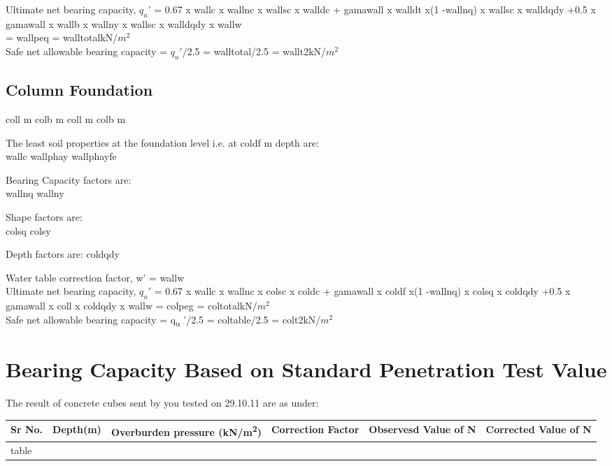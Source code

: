 \documentclass{soil12}
\begin{document}
Ultimate net bearing capacity, $q_u$' = 0.67 x {{wallc}} x {{wallnc}} x {{wallsc}} x {{walldc}} + {{gamawall}} x {{walldt}} x(1 -{{wallnq}}) x {{wallsc}} x {{walldqdy}} +0.5 x {{gamawall}} x {{wallb}} x {{wallny}} x {{wallsc}} x {{walldqdy}} x {{wallw}}\\
= {{wallpeq}} = {{walltotal}}kN/$m^2$ \\	
Safe net allowable bearing capacity = $q_u'$/2.5 = {{walltotal}}/2.5 = {{wallt2}}kN/$m^2$
\subsection{Column Foundation}
{
{{coll}}
 m}
{
{{colb}}
 m}
{
{{coll}}
 m}
{
{{colb}}
 m}

The least soil properties at the foundation level i.e. at {{coldf}} m depth are: \\
{
{{wallc}}
}
{
{{wallphay}}
}
{
{{wallphayfe}}
}

Bearing Capacity factors are:\\
{
{{wallnq}}
}
{
{{wallny}}
}

Shape factors are:\\
{
{{colsq}}
}
{
{{colsy}}
}

Depth factors are:
{
{{coldqdy}}
}

Water table correction factor, w' = {{wallw}} \\

Ultimate net bearing capacity, $q_u'$ = 0.67 x {{wallc}} x {{wallnc}} x {{colsc}} x {{coldc}} + {{gamawall}} x {{coldf}} x(1 -{{wallnq}}) x {{colsq}} x {{coldqdy}} 
+0.5 x {{gamawall}} x {{coll}} x {{coldqdy}} x {{wallw}} 
= {{colpeg}} = {{coltotal}}kN/$m^2$ \\ Safe net allowable bearing capacity = q\textsubscript{u} '/2.5 = {{coltable}}/2.5 = {{colt2}}kN/$m^2$
\section{Bearing Capacity Based on Standard Penetration Test Value}

\begin{center}
The result of concrete cubes sent by you tested on 29.10.11 are as under:
\end{center}
\hspace{1.1cm}
\begin{tabularx}{\textwidth}{|*{6}{l|}}
\hline
 \multicolumn{1}{|m{1cm}|}{Sr No.} &\multicolumn{1}{m{2cm}|}{Depth(m)} &\multicolumn{1}{m{2.5cm}|}{Overburden pressure (kN/m\textsuperscript{2})}
&\multicolumn{1}{m{2cm}|}{Correction Factor} &\multicolumn{1}{m{2cm}|}{Observesd Value of N} &\multicolumn{1}{m{2.9cm}|}{Corrected Value of N}\\
\hline
{{table}}
\end{tabularx}
\end{document}
